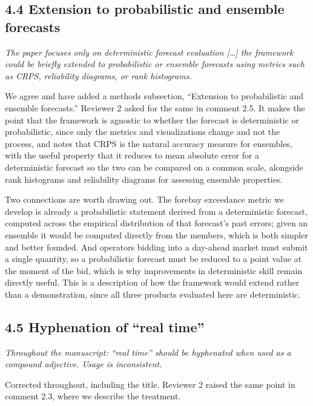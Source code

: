 \documentclass[11pt]{article}
\newenvironment{rc}%
  {\begin{list}{}{\setlength{\leftmargin}{1.5em}\setlength{\rightmargin}{1.5em}%
   \setlength{\topsep}{0.2em}\setlength{\parsep}{0pt}\setlength{\itemsep}{0pt}}%
   \item[]\itshape\color{quotegray}}%
  {\end{list}}
\begin{document}
\subsection*{4.4 Extension to probabilistic and ensemble forecasts}

\begin{rc}
The paper focuses only on deterministic forecast evaluation [\ldots] the framework could be
briefly extended to probabilistic or ensemble forecasts using metrics such as CRPS, reliability
diagrams, or rank histograms.
\end{rc}

We agree and have added a methods subsection, ``Extension to probabilistic and ensemble forecasts.''
Reviewer 2 asked for the same in comment 2.5. It makes the point that the framework is agnostic to
whether the forecast is deterministic or probabilistic, since only the metrics and visualizations
change and not the process, and notes that CRPS is the natural accuracy measure for ensembles, with
the useful property that it reduces to mean absolute error for a deterministic forecast so the two
can be compared on a common scale, alongside rank histograms and reliability diagrams for assessing
ensemble properties.

Two connections are worth drawing out. The forebay exceedance metric we develop is already a
probabilistic statement derived from a deterministic forecast, computed across the empirical
distribution of that forecast's past errors; given an ensemble it would be computed directly from the
members, which is both simpler and better founded. And operators bidding into a day-ahead market must
submit a single quantity, so a probabilistic forecast must be reduced to a point value at the moment
of the bid, which is why improvements in deterministic skill remain directly useful. This is a
description of how the framework would extend rather than a demonstration, since all three products
evaluated here are deterministic.

\subsection*{4.5 Hyphenation of ``real time''}

\begin{rc}
Throughout the manuscript: ``real time'' should be hyphenated when used as a compound adjective.
Usage is inconsistent.
\end{rc}

Corrected throughout, including the title. Reviewer 2 raised the same point in comment 2.3, where we
describe the treatment.
\end{document}
